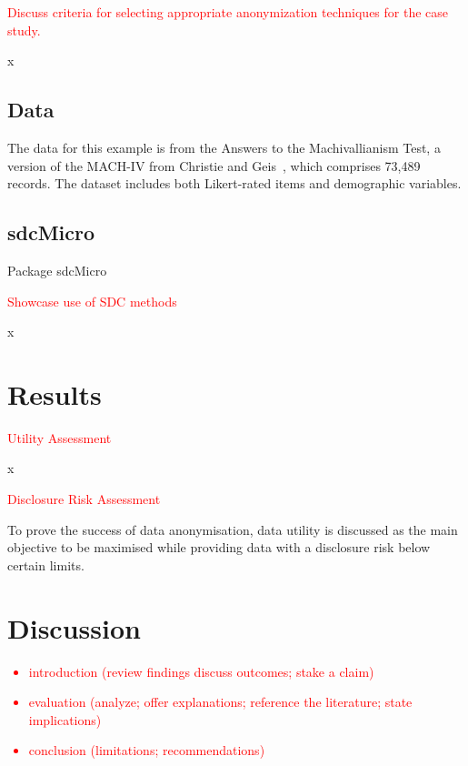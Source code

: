 \documentclass{article}
\begin{document}
\textcolor{red}{Discuss criteria for selecting appropriate anonymization techniques for the case study.}

x

\subsection{Data}

The data for this example is from the Answers to the Machivallianism Test, a version of the MACH-IV from Christie and Geis~\cite{Data}, which comprises 73,489 records.
The dataset includes both Likert-rated items and demographic variables.

\subsection{sdcMicro}

Package sdcMicro~\cite{2024_Sdcmicro}

\textcolor{red}{Showcase use of SDC methods}

x

\section{Results}

\textcolor{red}{Utility Assessment}

x

\textcolor{red}{Disclosure Risk Assessment}

To prove the success of data anonymisation, data utility is discussed as the main objective to be maximised while providing data with a disclosure risk below certain limits.

\section{Discussion}

\textcolor{red}{
\begin{itemize}
    \item introduction (review findings discuss outcomes; stake a claim)
    \item evaluation (analyze; offer explanations; reference the literature; state implications)    
    \item conclusion (limitations; recommendations)
\end{itemize}
} %
\end{document}
